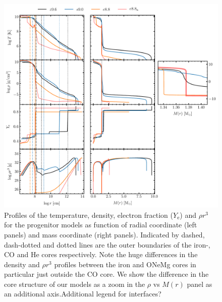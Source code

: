 \documentclass[fleqn,usenatbib]{mnras}
\newcommand{\COM}[1]{{\color{red}#1}}
\begin{document}

\begin{figure}
 \centering
 \includegraphics[width=\textwidth]{./pic/progenitors_tem_rho_ye_rhor}
 \caption{Profiles of the temperature, density, electron fraction ($Y_{\text{e}}$) and $\rho r^3$ for the progenitor models as function of radial coordinate (left panels) and mass coordinate (right panels). Indicated by dashed, dash-dotted and dotted lines are the outer boundaries of the iron-, CO and He cores respectively. Note the huge differences in the density and $\rho r^3$ profiles between the iron and ONeMg cores in particular just outside the CO core. We show the difference in the core structure of our models as a zoom in the $\rho$ vs $M(r)$ panel as an additional axis.\COM{Additional legend for interfaces?}}
 \label{fig:prog_tem_rho_ye_rhor}
\end{figure}
\end{document}
